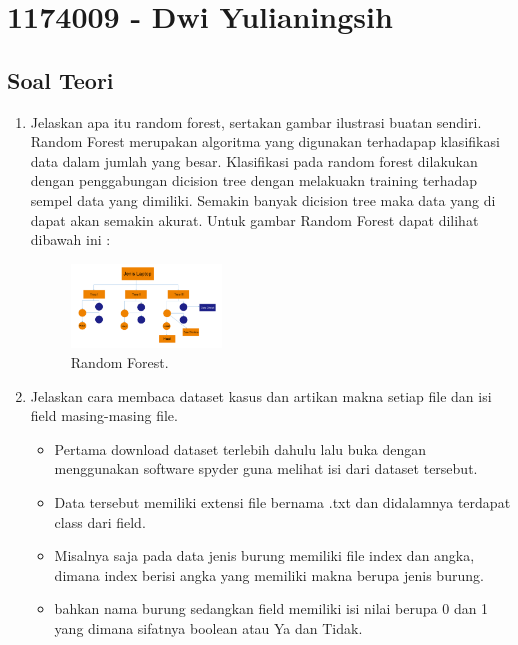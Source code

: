 \section{1174009 - Dwi Yulianingsih}
\subsection{Soal Teori}
\begin{enumerate}

	\item Jelaskan apa itu random forest, sertakan gambar ilustrasi buatan sendiri.
	\hfill\break
	Random Forest merupakan algoritma yang digunakan terhadapap klasifikasi data dalam jumlah yang besar. Klasifikasi pada random forest dilakukan dengan penggabungan dicision tree dengan melakuakn training terhadap sempel data yang dimiliki. Semakin banyak dicision tree maka data yang di dapat akan semakin akurat. Untuk gambar Random Forest dapat dilihat dibawah ini :

	\begin{figure}[H]
	\centering
		\includegraphics[width=4cm]{figures/1174009/tugas3/materi/M1.PNG}
		\caption{Random Forest.}
	\end{figure}

	\item Jelaskan cara membaca dataset kasus dan artikan makna setiap file dan isi field masing-masing file.
	\hfill\break

	\begin{itemize}
		\item Pertama download dataset terlebih dahulu lalu buka dengan menggunakan software spyder guna melihat isi dari dataset tersebut.

		\item Data tersebut memiliki extensi file bernama .txt dan didalamnya terdapat class dari field.

		\item Misalnya saja pada data jenis burung memiliki file index dan angka, dimana index berisi angka yang memiliki makna berupa jenis burung.

		\item bahkan nama burung sedangkan field memiliki isi nilai berupa 0 dan 1 yang dimana sifatnya boolean atau Ya dan Tidak.


\end{itemize}
\end{enumerate}
